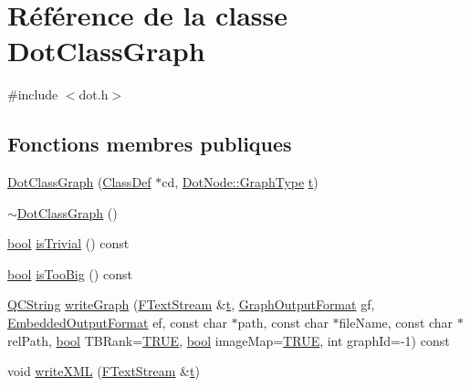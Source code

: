 \hypertarget{class_dot_class_graph}{}\section{Référence de la classe Dot\+Class\+Graph}
\label{class_dot_class_graph}


{\ttfamily \#include $<$dot.\+h$>$}

\subsection*{Fonctions membres publiques}
\begin{DoxyCompactItemize}
\item 
\hyperlink{class_dot_class_graph_a58b57d060db4c9c4127e13719ed497b0}{Dot\+Class\+Graph} (\hyperlink{class_class_def}{Class\+Def} $\ast$cd, \hyperlink{class_dot_node_ac4e8b27d54919cd0afa73f4c8c7d569c}{Dot\+Node\+::\+Graph\+Type} \hyperlink{058__bracket__recursion_8tcl_a69e959f6901827e4d8271aeaa5fba0fc}{t})
\item 
\hyperlink{class_dot_class_graph_a0b61a10dee46f6b05575aa3d1b6c8800}{$\sim$\+Dot\+Class\+Graph} ()
\item 
\hyperlink{qglobal_8h_a1062901a7428fdd9c7f180f5e01ea056}{bool} \hyperlink{class_dot_class_graph_a11e509dc8e9341a448a9e19e079122c5}{is\+Trivial} () const 
\item 
\hyperlink{qglobal_8h_a1062901a7428fdd9c7f180f5e01ea056}{bool} \hyperlink{class_dot_class_graph_a357c7131aa9501d65a91ae3493511ae5}{is\+Too\+Big} () const 
\item 
\hyperlink{class_q_c_string}{Q\+C\+String} \hyperlink{class_dot_class_graph_aabc2647cb2c73a81e4ea059c6fb2f9f2}{write\+Graph} (\hyperlink{class_f_text_stream}{F\+Text\+Stream} \&\hyperlink{058__bracket__recursion_8tcl_a69e959f6901827e4d8271aeaa5fba0fc}{t}, \hyperlink{dot_8h_ac60ef98d62b78366a17c9f1bda96523f}{Graph\+Output\+Format} gf, \hyperlink{dot_8h_a8680135da08a5ef57cebe20060912dcc}{Embedded\+Output\+Format} ef, const char $\ast$path, const char $\ast$file\+Name, const char $\ast$rel\+Path, \hyperlink{qglobal_8h_a1062901a7428fdd9c7f180f5e01ea056}{bool} T\+B\+Rank=\hyperlink{qglobal_8h_a04a6422a52070f0dc478693da640242b}{T\+R\+U\+E}, \hyperlink{qglobal_8h_a1062901a7428fdd9c7f180f5e01ea056}{bool} image\+Map=\hyperlink{qglobal_8h_a04a6422a52070f0dc478693da640242b}{T\+R\+U\+E}, int graph\+Id=-\/1) const 
\item 
void \hyperlink{class_dot_class_graph_ab0c9eaee7ee8abd4ffe7f849dd449da8}{write\+X\+M\+L} (\hyperlink{class_f_text_stream}{F\+Text\+Stream} \&\hyperlink{058__bracket__recursion_8tcl_a69e959f6901827e4d8271aeaa5fba0fc}{t})

\end{DoxyCompactItemize}
